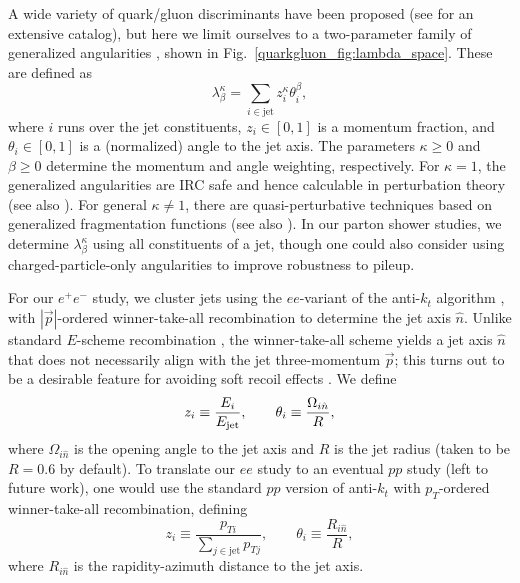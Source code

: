\documentclass[11pt]{cernrep}
\begin{document}
A wide variety of quark/gluon discriminants have been proposed (see \cite{Gallicchio:2012ez} for an extensive catalog), but here we limit ourselves to a two-parameter family of generalized angularities \cite{Larkoski:2014pca}, shown in Fig.~\ref{quarkgluon_fig:lambda_space}.  These are defined as
\begin{equation}
\label{quarkgluon_eq:genang}
\lambda^{\kappa}_{\beta} = \sum_{i \in \text{jet}} z_i^\kappa \theta_i^\beta,
\end{equation}
where $i$ runs over the jet constituents, $z_i \in [0,1]$ is a momentum fraction, and $\theta_i \in [0,1]$ is a (normalized) angle to the jet axis.  The parameters $\kappa \ge 0$ and $\beta \ge 0$ determine the momentum and angle weighting, respectively.  For $\kappa = 1$, the generalized angularities are IRC safe and hence calculable in perturbation theory \cite{Larkoski:2014uqa} (see also \cite{Ellis:2010rwa,Larkoski:2013paa,Larkoski:2014tva,Procura:2014cba,Hornig:2016ahz}).  For general $\kappa \not= 1$, there are quasi-perturbative techniques based on generalized fragmentation functions \cite{Larkoski:2014pca} (see also \cite{Krohn:2012fg,Waalewijn:2012sv,Chang:2013rca,Chang:2013iba}).  In our parton shower studies, we determine $\lambda^{\kappa}_{\beta}$ using all constituents of a jet, though one could also consider using charged-particle-only angularities to improve robustness to pileup.

For our $e^+ e^-$ study, we cluster jets using the $ee$-variant of the
anti-$k_t$ algorithm \cite{Cacciari:2008gp}, with $|\vec{p}|$-ordered
winner-take-all recombination
\cite{Larkoski:2014uqa,Bertolini:2013iqa,Salam:WTAUnpublished} to
determine the jet axis $\hat{n}$.  Unlike standard $E$-scheme
recombination \cite{Blazey:2000qt}, the winner-take-all scheme yields
a jet axis $\hat{n}$ that does not necessarily align with the jet
three-momentum $\vec{p}$; this turns out to be a desirable feature
for avoiding soft recoil effects
\cite{Larkoski:2013eya,Larkoski:2014uqa,Catani:1992jc,Dokshitzer:1998kz,Banfi:2004yd}.
We define
\begin{equation}
z_i \equiv \frac{E_i}{E_{\rm jet}}, \qquad \theta_i \equiv \frac{\Omega_{i \hat{n}}}{R},
\end{equation}
where $\Omega_{i \hat{n}}$ is the opening angle to the jet axis and $R$ is the jet radius (taken to be $R = 0.6$ by default).  To translate our $ee$ study to an eventual $pp$ study (left to future work), one would use the standard $pp$ version of anti-$k_t$ with $p_T$-ordered winner-take-all recombination, defining
\begin{equation}
z_i \equiv \frac{p_{Ti}}{\sum_{j \in \text{jet}} p_{Tj}}, \qquad \theta_i \equiv \frac{R_{i \hat{n}}}{R},
\end{equation}
where $R_{i \hat{n}}$ is the rapidity-azimuth distance to the jet axis.
\end{document}
